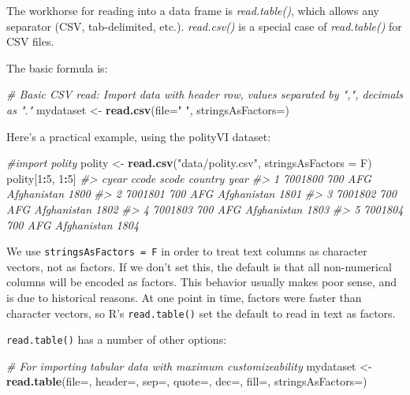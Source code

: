 \documentclass[]{book}
\newenvironment{Shaded}{\begin{snugshade}}{\end{snugshade}}
\newcommand{\KeywordTok}[1]{\textcolor[rgb]{0.13,0.29,0.53}{\textbf{#1}}}
\newcommand{\DataTypeTok}[1]{\textcolor[rgb]{0.13,0.29,0.53}{#1}}
\newcommand{\DecValTok}[1]{\textcolor[rgb]{0.00,0.00,0.81}{#1}}
\newcommand{\StringTok}[1]{\textcolor[rgb]{0.31,0.60,0.02}{#1}}
\newcommand{\CommentTok}[1]{\textcolor[rgb]{0.56,0.35,0.01}{\textit{#1}}}
\newcommand{\OperatorTok}[1]{\textcolor[rgb]{0.81,0.36,0.00}{\textbf{#1}}}
\newcommand{\NormalTok}[1]{#1}
\begin{document}
The workhorse for reading into a data frame is \emph{read.table()},
which allows any separator (CSV, tab-delimited, etc.). \emph{read.csv()}
is a special case of \emph{read.table()} for CSV files.

The basic formula is:

\begin{Shaded}
\begin{Highlighting}[]
\CommentTok{# Basic CSV read: Import data with header row, values separated by ",", decimals as "."}
\NormalTok{mydataset <-}\StringTok{ }\KeywordTok{read.csv}\NormalTok{(}\DataTypeTok{file=}\StringTok{"  "}\NormalTok{, }\DataTypeTok{stringsAsFactors=}\NormalTok{)}
\end{Highlighting}
\end{Shaded}

Here's a practical example, using the polityVI dataset:

\begin{Shaded}
\begin{Highlighting}[]
\CommentTok{#import polity}
\NormalTok{polity <-}\StringTok{ }\KeywordTok{read.csv}\NormalTok{(}\StringTok{"data/polity.csv"}\NormalTok{, }\DataTypeTok{stringsAsFactors =}\NormalTok{ F)}
\NormalTok{polity[}\DecValTok{1}\OperatorTok{:}\DecValTok{5}\NormalTok{, }\DecValTok{1}\OperatorTok{:}\DecValTok{5}\NormalTok{]}
\CommentTok{#>     cyear ccode scode     country year}
\CommentTok{#> 1 7001800   700   AFG Afghanistan 1800}
\CommentTok{#> 2 7001801   700   AFG Afghanistan 1801}
\CommentTok{#> 3 7001802   700   AFG Afghanistan 1802}
\CommentTok{#> 4 7001803   700   AFG Afghanistan 1803}
\CommentTok{#> 5 7001804   700   AFG Afghanistan 1804}
\end{Highlighting}
\end{Shaded}

We use \texttt{stringsAsFactors\ =\ F} in order to treat text columns as
character vectors, not as factors. If we don't set this, the default is
that all non-numerical columns will be encoded as factors. This behavior
usually makes poor sense, and is due to historical reasons. At one point
in time, factors were faster than character vectors, so R's
\texttt{read.table()} set the default to read in text as factors.

\texttt{read.table()} has a number of other options:

\begin{Shaded}
\begin{Highlighting}[]
\CommentTok{# For importing tabular data with maximum customizeability}
\NormalTok{mydataset <-}\StringTok{ }\KeywordTok{read.table}\NormalTok{(}\DataTypeTok{file=}\NormalTok{, }\DataTypeTok{header=}\NormalTok{, }\DataTypeTok{sep=}\NormalTok{, }\DataTypeTok{quote=}\NormalTok{, }\DataTypeTok{dec=}\NormalTok{, }\DataTypeTok{fill=}\NormalTok{, }\DataTypeTok{stringsAsFactors=}\NormalTok{)}
\end{Highlighting}
\end{Shaded}
\end{document}
